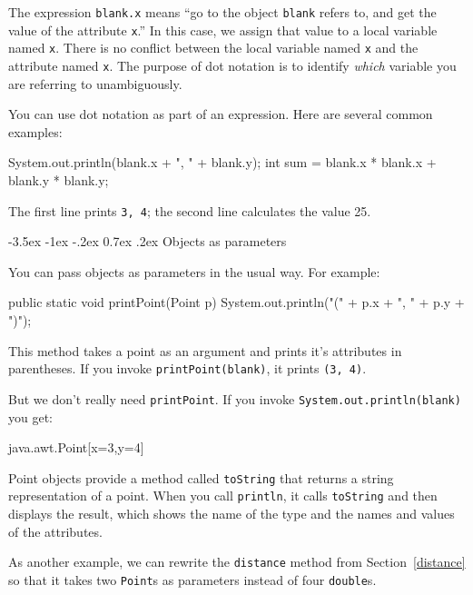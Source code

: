 \documentclass[12pt]{book}
\makeatletter
\theoremstyle{exercise}
\newcommand{\java}[1]{\verb"#1"}
\renewcommand{\section}{\@startsection{section}{1}{\z@}%
    {-3.5ex \@plus -1ex \@minus -.2ex}%
    {0.7ex \@plus.2ex}%
    {\normalfont\Large\bfseries}}
\newcommand{\java}[1]{\lstinline{#1}} %
\makeatother
\begin{document}
The expression \java{blank.x} means ``go to the object \java{blank} refers to, and get the value of the attribute \java{x}.''
In this case, we assign that value to a local variable named \java{x}.
There is no conflict between the local variable named \java{x} and the attribute named \java{x}.
The purpose of dot notation is to identify {\em which} variable you are referring to unambiguously.

You can use dot notation as part of an expression.
Here are several common examples:

\begin{code}
    System.out.println(blank.x + ", " + blank.y);
    int sum = blank.x * blank.x + blank.y * blank.y;
\end{code}

The first line prints {\tt 3, 4}; the second line calculates the value 25.


\section{Objects as parameters}


You can pass objects as parameters in the usual way.
For example:

\begin{code}
    public static void printPoint(Point p) {
        System.out.println("(" + p.x + ", " + p.y + ")");
    }
\end{code}

This method takes a point as an argument and prints it's attributes in parentheses.
If you invoke \java{printPoint(blank)}, it prints \java{(3, 4)}.

But we don't really need \java{printPoint}.
If you invoke \java{System.out.println(blank)} you get:

\begin{stdout}
java.awt.Point[x=3,y=4]
\end{stdout}

Point objects provide a method called \java{toString} that returns a string representation of a point.
When you call \java{println}, it calls {\tt toString} and then displays the result, which shows the name of the type and the names and values of the attributes.

As another example, we can rewrite the \java{distance} method from Section~\ref{distance} so that it takes two \java{Point}s as parameters instead of four \java{double}s.
\end{document}
